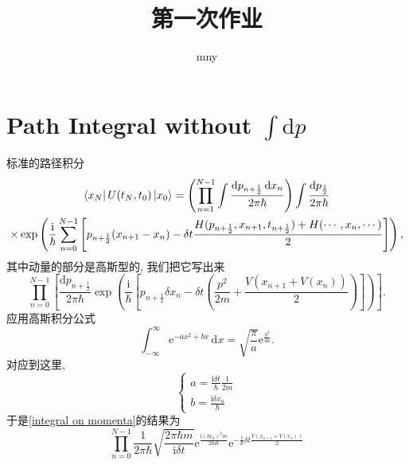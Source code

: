 \documentclass{ctexart}
\title{第一次作业}
\author{mny}
\begin{document}
\maketitle

\section{Path Integral without $\int \mathrm{d} p$}
标准的路径积分
\begin{equation}
  \begin{gathered}
    \bra{x_N}U(t_N, t_0)\ket{x_0} = \left( \prod_{n=1}^{N-1} \int \frac{\mathrm{d} p_{n+ \frac{1}{2}} \, \mathrm{d} x_n}{2\pi \hbar} \right) \int  \frac{\mathrm{d} p_{\frac{1}{2}}}{2\pi\hbar} 
    \\
    \times 
    \exp\left( 
        \frac{\mathrm{i} }{\hbar} \sum_{n=0}^{N-1} \left[ p_{n+ \frac{1}{2}}(x_{n+1}- x_n) - \delta t \frac{H(p_{n+\frac{1}{2}},x_{n+1}, t_{n+ \frac{1}{2}}) + H(\cdots, x_{n},\cdots)}{2} \right] 
     \right) ,
  \end{gathered}
\end{equation}
其中动量的部分是高斯型的, 我们把它写出来
\begin{equation}\label{integral on momenta}
  \prod_{n=0}^{N-1} \left[ 
    \frac{\mathrm{d} p_{n+ \frac{1}{2}}}{2\pi\hbar} \exp \left( 
        \frac{\mathrm{i} }{\hbar}\left[ p_{n+ \frac{1}{2}}\delta x_n - \delta t \left( \frac{p^2}{2m}+ \frac{V(x_{n+1}+V(x_n))}{2} \right)  \right] 
     \right) 
   \right] .
\end{equation}
应用高斯积分公式
\begin{equation}
  \int_{-\infty}^{\infty} \mathrm{e}^{-a x^2 + bx} \, \mathrm{d}x = \sqrt{\frac{\pi}{a}} \mathrm{e}^{ \frac{b^2}{4a}}.
\end{equation}
对应到这里,
\begin{equation}
  \begin{cases} 
    a = \frac{\mathrm{i} \delta t}{\hbar} \frac{1}{2m}
    \\ 
    b = \frac{\mathrm{i} \delta x_n}{\hbar}
  \end{cases}
\end{equation}
于是\eqref{integral on momenta}的结果为
\begin{equation}
  \prod_{n=0}^{N-1} \frac{1}{2\pi\hbar} \sqrt{\frac{2\pi \hbar m}{\mathrm{i} \delta t}} \mathrm{e}^{\frac{\mathrm{i} (\delta x_n)^2 m}{2\hbar \delta t}} 
  \mathrm{e}^{- \frac{\mathrm{i} }{\hbar}\delta t \frac{V(x_{n+1}+ V(x_n))}{2}}
\end{equation}
\end{document}
